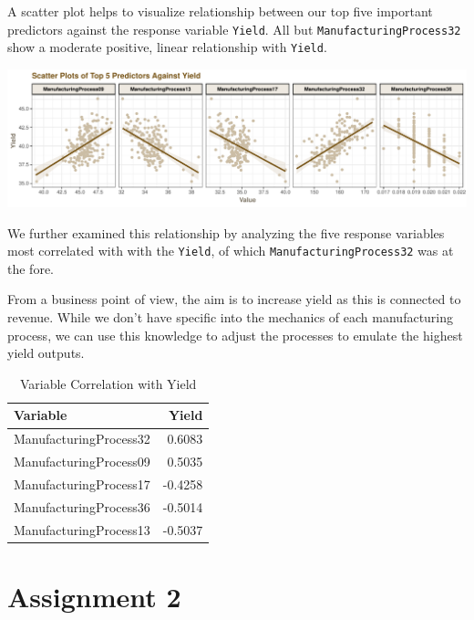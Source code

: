 \documentclass[]{report}
\begin{document}
A scatter plot helps to visualize relationship between our top five
important predictors against the response variable \texttt{Yield}. All
but \texttt{ManufacturingProcess32} show a moderate positive, linear
relationship with \texttt{Yield}.

\includegraphics{AppliedPredictiveModeling_treebased_regression_files/figure-latex/kj-6.3f-1-1.pdf}

We further examined this relationship by analyzing the five response
variables most correlated with with the \texttt{Yield}, of which
\texttt{ManufacturingProcess32} was at the fore.

From a business point of view, the aim is to increase yield as this is
connected to revenue. While we don't have specific into the mechanics of
each manufacturing process, we can use this knowledge to adjust the
processes to emulate the highest yield outputs.

\begin{table}[H]

\caption{\label{tab:kj-6.3f-2}Variable Correlation with Yield}
\centering
\fontsize{8}{10}\selectfont
\begin{tabular}[t]{lr}
\toprule
\textbf{Variable} & \textbf{Yield}\\
\midrule
\rowcolor{gray!6}  ManufacturingProcess32 & 0.6083\\
ManufacturingProcess09 & 0.5035\\
\rowcolor{gray!6}  ManufacturingProcess17 & -0.4258\\
ManufacturingProcess36 & -0.5014\\
\rowcolor{gray!6}  ManufacturingProcess13 & -0.5037\\
\bottomrule
\end{tabular}
\end{table}

\chapter*{Assignment 2}\label{AS-2}
\end{document}
